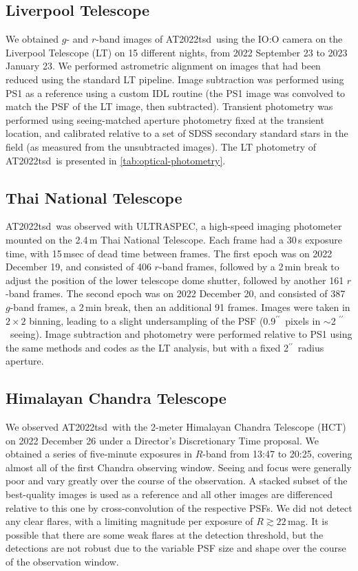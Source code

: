 \documentclass{nature_plusfigure}
\newcommand{\at}{AT2022tsd}
\newcommand{\arcsec}{$^{\prime\prime}$}
\begin{document}
\begin{methods}
\subsection{Liverpool Telescope}
\label{Methods: LT}

We obtained $g$- and $r$-band images of \at\ using the IO:O camera on the Liverpool Telescope\cite{Steele2004} (LT) on 15 different nights, from 2022 September 23 to 2023 January 23. We performed astrometric alignment on images that had been reduced using the standard LT pipeline.  Image subtraction was performed using PS1 as a reference using a custom IDL routine (the PS1 image was convolved to match the PSF of the LT image, then subtracted).  Transient photometry was performed using seeing-matched aperture photometry fixed at the transient location, and calibrated relative to a set of SDSS secondary standard stars in the field (as measured from the unsubtracted images). The LT photometry of \at\ is presented in \ref{tab:optical-photometry}.

\subsection{Thai National Telescope}

\at\ was observed with ULTRASPEC\cite{Dhillon2014}, a high-speed imaging photometer mounted on the 2.4\,m Thai National Telescope. Each frame had a 30\,s exposure time, with 15\,msec of dead time between frames. The first epoch was on 2022 December 19, and consisted of 406 $r$-band frames, followed by a 2\,min break to adjust the position of the lower telescope dome shutter, followed by another 161 $r$-band frames. The second epoch was on 2022 December 20, and consisted of 387 $g$-band frames, a 2\,min break, then an additional 91 frames.  Images were taken in $2\times2$ binning, leading to a slight undersampling of the PSF (0.9\arcsec\ pixels in $\sim$2 \arcsec\ seeing).  Image subtraction and photometry were performed relative to PS1 using the same methods and codes as the LT analysis, but with a fixed 2\arcsec\ radius aperture.

\subsection{Himalayan Chandra Telescope}
\label{sec:HCT}

We observed \at\ with the 2-meter Himalayan Chandra Telescope (HCT) on 2022 December 26 under a Director's Discretionary Time proposal. We obtained a series of five-minute exposures in $R$-band from 13:47 to 20:25, covering almost all of the first Chandra observing window.  Seeing and focus were generally poor and vary greatly over the course of the observation.  A stacked subset of the best-quality images is used as a reference and all other images are differenced relative to this one by cross-convolution of the respective PSFs.   We did not detect any clear flares, with a limiting magnitude per exposure of $R\gtrsim22\,$mag. It is possible that there are some weak flares at the detection threshold, but the detections are not robust due to the variable PSF size and shape over the course of the observation window.


\end{methods}
\end{document}
